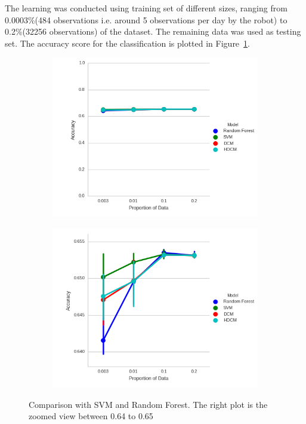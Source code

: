 The learning was conducted using training set of different sizes, ranging from 0.0003\%(484 observations i.e. around 5 observations per day by the robot) to 0.2\%(32256 observations) of the dataset. The remaining data was used as testing set. The accuracy score for the classification is plotted in Figure~\ref{fig:SVM_vs_DCM}. 

\begin{figure}
    \centering
    \begin{subfigure}[b]{0.44\textwidth}
        \includegraphics[width=\textwidth]{images/svm_vs_HDCM.png}
    \end{subfigure}
    \begin{subfigure}[b]{0.44\textwidth}
        \includegraphics[width=\textwidth]{images/svm_vs_HDCM_zoomed.png}       
    \end{subfigure}
    
    \caption[Comparison with SVM and Random Forest]{ Comparison with SVM and Random Forest. The right plot is the zoomed view between 0.64 to 0.65}
    \label{fig:SVM_vs_DCM}
\end{figure}

